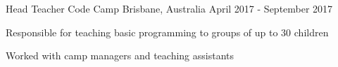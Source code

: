 \begin{cventries}

\cventry
{Head Teacher} %
{Code Camp} %
{Brisbane, Australia} %
{April 2017 - September 2017} %
{ %
\begin{cvitems}
\item {Responsible for teaching basic programming to groups of up to 30 children}
\item {Worked with camp managers and teaching assistants}
\end{cvitems}
}


\end{cventries}
